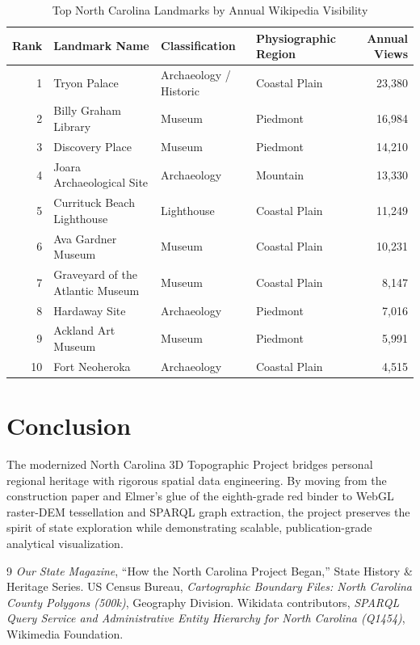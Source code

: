 \documentclass[11pt,letterpaper]{article}
\begin{document}
\begin{table}[H]
\centering
\small
\color{CharcoalSlate}
\setlength{\tabcolsep}{7pt}
\renewcommand{\arraystretch}{1.12}
\caption{Top North Carolina Landmarks by Annual Wikipedia Visibility}
\label{tab:top_landmarks}
\vspace{0.25cm}
\begin{tabular}{r l l l r}
\toprule
\textbf{Rank} & \textbf{Landmark Name} & \textbf{Classification} & \textbf{Physiographic Region} & \textbf{Annual Views} \\
\midrule
1  & Tryon Palace                     & Archaeology / Historic & Coastal Plain & 23,380 \\
2  & Billy Graham Library             & Museum                 & Piedmont      & 16,984 \\
3  & Discovery Place                  & Museum                 & Piedmont      & 14,210 \\
4  & Joara Archaeological Site        & Archaeology            & Mountain      & 13,330 \\
5  & Currituck Beach Lighthouse       & Lighthouse             & Coastal Plain & 11,249 \\
6  & Ava Gardner Museum               & Museum                 & Coastal Plain & 10,231 \\
7  & Graveyard of the Atlantic Museum & Museum                 & Coastal Plain &  8,147 \\
8  & Hardaway Site                    & Archaeology            & Piedmont      &  7,016 \\
9  & Ackland Art Museum               & Museum                 & Piedmont      &  5,991 \\
10 & Fort Neoheroka                   & Archaeology            & Coastal Plain &  4,515 \\
\bottomrule
\end{tabular}
\end{table}

\section{Conclusion}

The modernized North Carolina 3D Topographic Project bridges personal regional heritage with rigorous spatial data engineering. By moving from the construction paper and Elmer's glue of the eighth-grade red binder to WebGL raster-DEM tessellation and SPARQL graph extraction, the project preserves the spirit of state exploration while demonstrating scalable, publication-grade analytical visualization.

\begin{thebibliography}{9}
\emph{Our State Magazine}, ``How the North Carolina Project Began,'' State History \& Heritage Series.
US Census Bureau, \emph{Cartographic Boundary Files: North Carolina County Polygons (500k)}, Geography Division.
Wikidata contributors, \emph{SPARQL Query Service and Administrative Entity Hierarchy for North Carolina (Q1454)}, Wikimedia Foundation.
\end{thebibliography}
\end{document}
